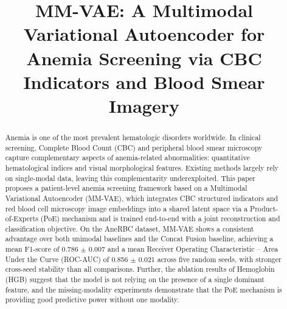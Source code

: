 \documentclass[conference]{IEEEtran}
\begin{document}
\title{MM-VAE: A Multimodal Variational Autoencoder for Anemia Screening via CBC Indicators and Blood Smear Imagery}

\author{
\and
{}
}

\maketitle
\begingroup
\renewcommand\thefootnote{}
\endgroup

\begin{abstract}
Anemia is one of the most prevalent hematologic disorders worldwide. In clinical screening, Complete Blood Count (CBC) and peripheral blood smear microscopy capture complementary aspects of anemia-related abnormalities: quantitative hematological indices and visual morphological features. Existing methods largely rely on single-modal data, leaving this complementarity underexploited. This paper proposes a patient-level anemia screening framework based on a Multimodal Variational Autoencoder (MM-VAE), which integrates CBC structured indicators and red blood cell microscopy image embeddings into a shared latent space via a Product-of-Experts (PoE) mechanism and is trained end-to-end with a joint reconstruction and classification objective. On the AneRBC dataset, MM-VAE shows a consistent advantage over both unimodal baselines and the Concat Fusion baseline, achieving a mean F1-score of 0.786 $\pm$ 0.007 and a mean Receiver Operating Characteristic -- Area Under the Curve (ROC-AUC) of 0.856 $\pm$ 0.021 across five random seeds, with stronger cross-seed stability than all comparisons. Further, the ablation results of Hemoglobin (HGB) suggest that the model is not relying on the presence of a single dominant feature, and the missing-modality experiments demonstrate that the PoE mechanism is providing good predictive power without one modality.
\end{abstract}
\end{document}
